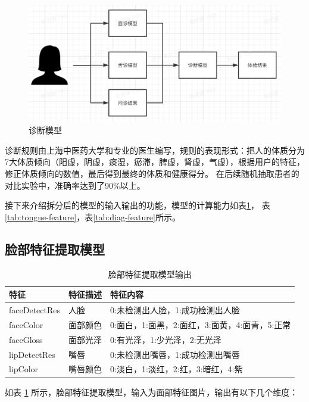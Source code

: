 \begin{figure}[ht]
    \centering
    \includegraphics[width=15cm]{images/model2.png}
    \caption{诊断模型}
    \label{fig:my_model2}
\end{figure}
诊断规则由上海中医药大学和专业的医生编写，规则的表现形式：把人的体质分为7大体质倾向（阳虚，阴虚，痰湿，瘀滞，脾虚，肾虚，气虚），根据用户的特征，修正体质倾向的数值，最后得到最终的体质和健康得分。
在后续随机抽取患者的对比实验中，准确率达到了90\%以上。

接下来介绍拆分后的模型的输入输出的功能，模型的计算能力如表\ref{tab:face-feature}， 表\ref{tab:tongue-feature}，表\ref{tab:diag-feature}所示。
\subsection{脸部特征提取模型}

\begin{table}[h]
    \centering
    \begin{tabular}{lll}
        \toprule
        特征          & 特征描述     & 特征内容 \\ 
        \midrule
        faceDetectRes & 人脸   & 0:未检测出人脸，1:成功检测出人脸  \\
        faceColor     & 面部颜色 & 0:面白，1:面黑，2:面红，3:面黄，4:面青，5:正常 \\
        faceGloss     & 面部光泽 & 0:有光泽，1:少光泽，2:无光泽\\
        lipDetectRes  & 嘴唇   & 0:未检测出嘴唇，1:成功检测出嘴唇\\
        lipColor      & 嘴唇颜色 & 0:淡白，1:淡红，2:红，3:暗红，4:紫   \\
        \bottomrule
    \end{tabular}
    \caption{脸部特征提取模型输出}
    \label{tab:face-feature}
\end{table}

如表 \ref{tab:face-feature} 所示，脸部特征提取模型，输入为面部特征图片，输出有以下几个维度：

